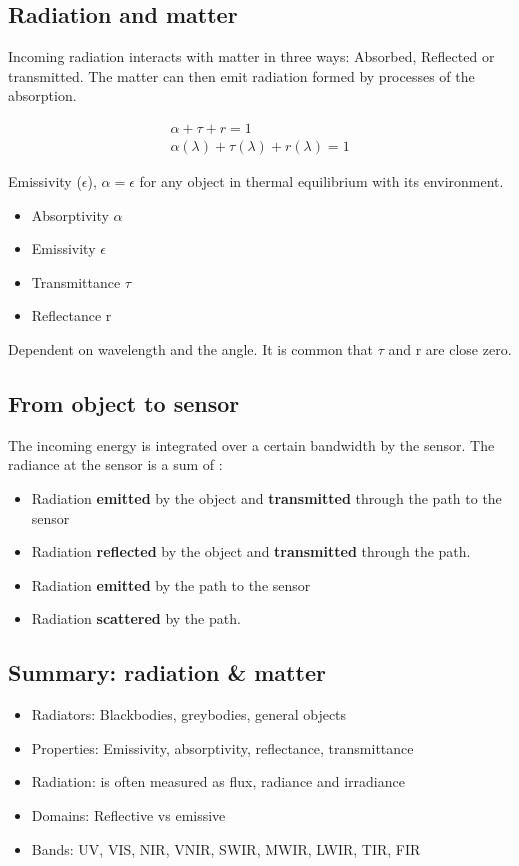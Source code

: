 	\subsection*{Radiation and matter}
	Incoming radiation interacts with matter in three ways: Absorbed, Reflected or transmitted. The matter can then emit radiation formed by processes of the absorption. 

	\begin{equation}
	\begin{aligned}
		\alpha + \tau + r = 1 \\
		\alpha(\lambda) + \tau(\lambda) + r(\lambda) = 1
	\end{aligned}
	\end{equation}

	Emissivity ($\epsilon$), $\alpha = \epsilon$ for any object in thermal equilibrium with its environment. 

	\begin{itemize}
		\item Absorptivity $\alpha$
		\item Emissivity $\epsilon$
		\item Transmittance $\tau$
		\item Reflectance r
	\end{itemize}

	Dependent on wavelength and the angle. It is common that $\tau$ and r are close zero. 

	\subsection*{From object to sensor}
	The incoming energy is integrated over a certain bandwidth by the sensor. The radiance at the sensor is a sum of :
	\begin{itemize}
		\item Radiation \textbf{emitted} by the object and \textbf{transmitted} through the path to the sensor
		\item Radiation \textbf{reflected} by the object and \textbf{transmitted} through the path.
		\item Radiation \textbf{emitted} by the path to the sensor
		\item Radiation \textbf{scattered} by the path. 
	\end{itemize}

	\subsection*{Summary: radiation \& matter}
	\begin{itemize}
		\item Radiators: Blackbodies, greybodies, general objects
		\item Properties: Emissivity, absorptivity, reflectance, transmittance
		\item Radiation: is often measured as flux, radiance and irradiance
		\item Domains: Reflective vs emissive
		\item Bands: UV, VIS, NIR, VNIR, SWIR, MWIR, LWIR, TIR, FIR
	\end{itemize}
	
